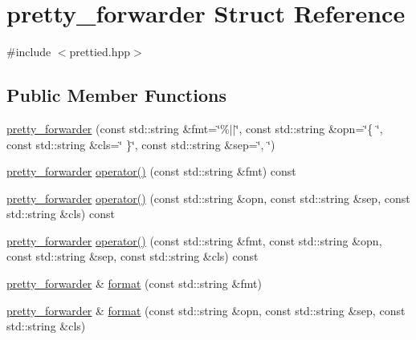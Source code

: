 \hypertarget{structyuh_1_1range__detail_1_1pretty__forwarder}{\section{pretty\-\_\-forwarder \-Struct \-Reference}
\label{db/d79/structyuh_1_1range__detail_1_1pretty__forwarder}
}


{\ttfamily \#include $<$prettied.\-hpp$>$}

\subsection*{\-Public \-Member \-Functions}
\begin{DoxyCompactItemize}
\item 
\hyperlink{structyuh_1_1range__detail_1_1pretty__forwarder_a82612e98fb4cbc627fcf56078525ce76}{pretty\-\_\-forwarder} (const std\-::string \&fmt=\char`\"{}\%$|$$|$\char`\"{}, const std\-::string \&opn=\char`\"{}\{ \char`\"{}, const std\-::string \&cls=\char`\"{} \}\char`\"{}, const std\-::string \&sep=\char`\"{}, \char`\"{})
\item 
\hyperlink{structyuh_1_1range__detail_1_1pretty__forwarder}{pretty\-\_\-forwarder} \hyperlink{structyuh_1_1range__detail_1_1pretty__forwarder_a75158d5c955ebc9f9e401293a465b710}{operator()} (const std\-::string \&fmt) const 
\item 
\hyperlink{structyuh_1_1range__detail_1_1pretty__forwarder}{pretty\-\_\-forwarder} \hyperlink{structyuh_1_1range__detail_1_1pretty__forwarder_a9121a7fd24e40d4b9c15eb252371df5f}{operator()} (const std\-::string \&opn, const std\-::string \&sep, const std\-::string \&cls) const 
\item 
\hyperlink{structyuh_1_1range__detail_1_1pretty__forwarder}{pretty\-\_\-forwarder} \hyperlink{structyuh_1_1range__detail_1_1pretty__forwarder_aa678a14ce8aba3d6693e31fc99f0d786}{operator()} (const std\-::string \&fmt, const std\-::string \&opn, const std\-::string \&sep, const std\-::string \&cls) const 
\item 
\hyperlink{structyuh_1_1range__detail_1_1pretty__forwarder}{pretty\-\_\-forwarder} \& \hyperlink{structyuh_1_1range__detail_1_1pretty__forwarder_adee00fbaf74dae57835e13a62456b94f}{format} (const std\-::string \&fmt)
\item 
\hyperlink{structyuh_1_1range__detail_1_1pretty__forwarder}{pretty\-\_\-forwarder} \& \hyperlink{structyuh_1_1range__detail_1_1pretty__forwarder_a28fa1c79464c422900386bbea428a15b}{format} (const std\-::string \&opn, const std\-::string \&sep, const std\-::string \&cls)
$$
\end{DoxyCompactItemize}
